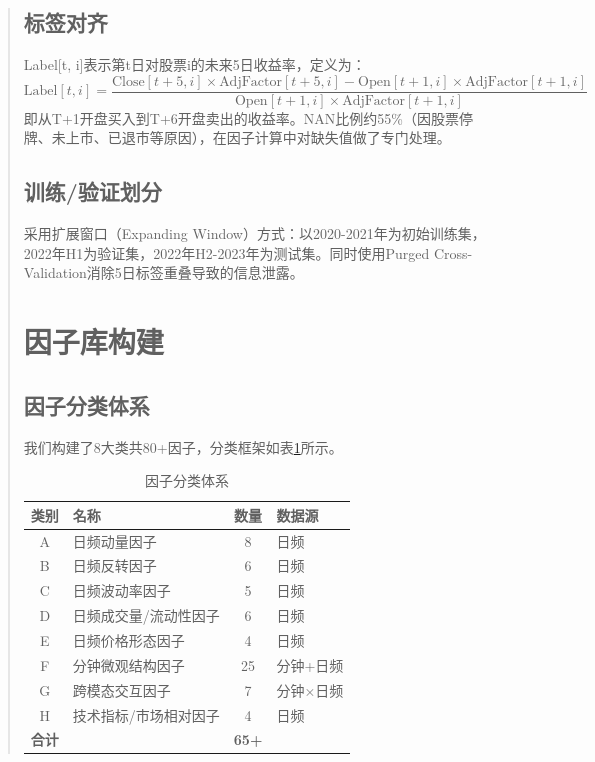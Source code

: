 \documentclass[12pt,a4paper]{article}
\begin{document}
\begin{abstract}
\subsection{标签对齐}
Label[t, i]表示第t日对股票i的未来5日收益率，定义为：
\begin{equation}
    \text{Label}[t, i] = \frac{\text{Close}[t+5, i] \times \text{AdjFactor}[t+5, i] - \text{Open}[t+1, i] \times \text{AdjFactor}[t+1, i]}{\text{Open}[t+1, i] \times \text{AdjFactor}[t+1, i]}
\end{equation}
即从T+1开盘买入到T+6开盘卖出的收益率。NAN比例约55\%（因股票停牌、未上市、已退市等原因），在因子计算中对缺失值做了专门处理。

\subsection{训练/验证划分}
采用扩展窗口（Expanding Window）方式：以2020-2021年为初始训练集，2022年H1为验证集，2022年H2-2023年为测试集。同时使用Purged Cross-Validation消除5日标签重叠导致的信息泄露。

\section{因子库构建}

\subsection{因子分类体系}
我们构建了8大类共80+因子，分类框架如表\ref{tab:factor_catalog}所示。

\begin{table}[H]
\centering
\caption{因子分类体系}
\label{tab:factor_catalog}
\begin{tabular}{clcl}
\toprule
\textbf{类别} & \textbf{名称} & \textbf{数量} & \textbf{数据源} \\
\midrule
A & 日频动量因子 & 8 & 日频 \\
B & 日频反转因子 & 6 & 日频 \\
C & 日频波动率因子 & 5 & 日频 \\
D & 日频成交量/流动性因子 & 6 & 日频 \\
E & 日频价格形态因子 & 4 & 日频 \\
F & 分钟微观结构因子 & 25 & 分钟+日频 \\
G & 跨模态交互因子 & 7 & 分钟×日频 \\
H & 技术指标/市场相对因子 & 4 & 日频 \\
\midrule
\textbf{合计} & & \textbf{65+} & \\
\bottomrule
\end{tabular}
\end{table}


\end{abstract}
\end{document}
